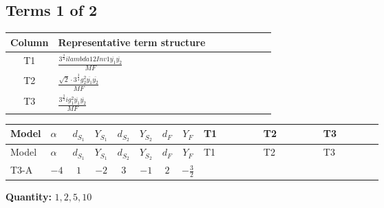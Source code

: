 \documentclass[8pt]{article}
\begin{document}
\begin{landscape}
\subsection*{Terms 1 of 2}
\begin{center}
\begin{tabular}{@{}c >{\raggedright\arraybackslash}p{0.82\linewidth}@{}}
\toprule
Column & Representative term structure \\
\midrule
T1 & \(\displaystyle \frac{3^{\frac{3}{4}} i lambda12Inv1 \overline{y_{1}} \overline{y_{2}}}{MF}\) \\
\midrule
T2 & \(\displaystyle \frac{\sqrt{2} \cdot 3^{\frac{3}{4}} g_{2}^{2} \overline{y_{1}} \overline{y_{2}}}{MF}\) \\
\midrule
T3 & \(\displaystyle \frac{3^{\frac{3}{4}} i g_{1}^{2} \overline{y_{1}} \overline{y_{2}}}{MF}\) \\
\midrule
\bottomrule
\end{tabular}
\end{center}
\smallskip
\tiny
\begin{longtable}{@{}llcccccc >{\raggedright\arraybackslash}p{0.21\linewidth} >{\raggedright\arraybackslash}p{0.21\linewidth} >{\raggedright\arraybackslash}p{0.21\linewidth}@{}}
\toprule
Model & $\alpha$ & $d_{S_1}$ & $Y_{S_1}$ & $d_{S_2}$ & $Y_{S_2}$ & $d_F$ & $Y_F$ & T1 & T2 & T3 \\
\midrule
\endfirsthead
\toprule
Model & $\alpha$ & $d_{S_1}$ & $Y_{S_1}$ & $d_{S_2}$ & $Y_{S_2}$ & $d_F$ & $Y_F$ & T1 & T2 & T3 \\
\midrule
\endhead
T3-A & $-4$ & $1$ & $-2$ & $3$ & $-1$ & $2$ & $-\frac{3}{2}$ & \scriptsize\adjustbox{max width=\linewidth}{$\begin{gathered} \frac{3^{\frac{3}{4}} i lambda12Inv1 \overline{y_{1}} \overline{y_{2}}}{6 MF}\end{gathered}$} & \scriptsize\adjustbox{max width=\linewidth}{$\begin{gathered} \frac{\sqrt{2} \cdot 3^{\frac{3}{4}} g_{2}^{2} \overline{y_{1}} \overline{y_{2}}}{6 MF}\end{gathered}$} & \scriptsize\adjustbox{max width=\linewidth}{$\begin{gathered} \frac{9 \cdot 3^{\frac{3}{4}} i g_{1}^{2} \overline{y_{1}} \overline{y_{2}}}{8 MF}\end{gathered}$} \\
\midrule
\bottomrule
\end{longtable}
\clearpage
\noindent\textbf{Quantity: }$\mathrm{1,2,5,10}$\par\smallskip

\end{landscape}
\end{document}
